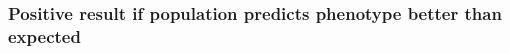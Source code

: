 \documentclass{beamer}
\begin{document}
\begin{frame}
\frametitle{\normalsize Positive result if population predicts phenotype better than expected}
\end{frame}
\end{document}

